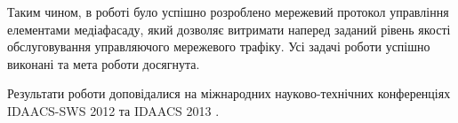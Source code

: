 \documentclass[a4paper,ukrainian,utf8,nocolumnsxix,floatsection,equationsection]{eskdtext}
\begin{document}
Таким чином, в роботі було успішно розроблено мережевий протокол управління елементами медіафасаду, який дозволяє витримати наперед заданий рівень якості обслуговування управляючого мережевого трафіку. Усі задачі роботи успішно виконані та мета роботи досягнута.

Результати роботи доповідалися на міжнародних науково-технічних конференціях IDAACS-SWS 2012 та IDAACS 2013 \cite{idaacs:2013:adhoc:media:facade,idaacs:2012:media:facade}.



% 



\label{sec:app_a:script}
\end{document}
